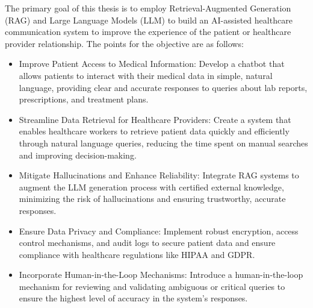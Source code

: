 The primary goal of this thesis is to employ Retrieval-Augmented Generation (RAG) and Large Language Models (LLM) to build an AI-assisted healthcare communication system to improve the experience of the patient or healthcare provider relationship. The points for the objective are as follows:

\begin{itemize}
    \item Improve Patient Access to Medical Information: Develop a chatbot that allows patients to interact with their medical data in simple, natural language, providing clear and accurate responses to queries about lab reports, prescriptions, and treatment plans.
    \item Streamline Data Retrieval for Healthcare Providers: Create a system that enables healthcare workers to retrieve patient data quickly and efficiently through natural language queries, reducing the time spent on manual searches and improving decision-making.
    \item Mitigate Hallucinations and Enhance Reliability: Integrate RAG systems to augment the LLM generation process with certified external knowledge, minimizing the risk of hallucinations and ensuring trustworthy, accurate responses.
    \item Ensure Data Privacy and Compliance: Implement robust encryption, access control mechanisms, and audit logs to secure patient data and ensure compliance with healthcare regulations like HIPAA\cite{hipaa} and GDPR\@.
    \item Incorporate Human-in-the-Loop Mechanisms: Introduce a human-in-the-loop mechanism for reviewing and validating ambiguous or critical queries to ensure the highest level of accuracy in the system's responses.
\end{itemize}